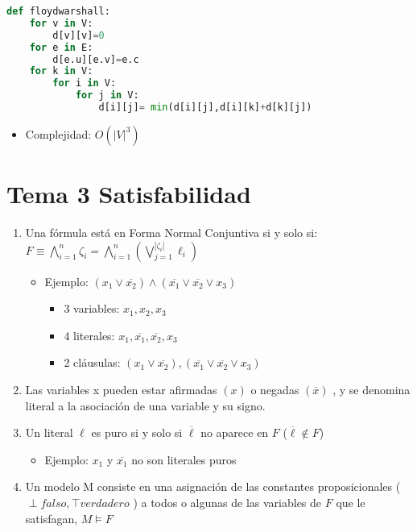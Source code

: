 \documentclass[12pt, twoside, openright]{report} %
\begin{document}
\begin{lstlisting}[language=Python]
def floydwarshall:
	for v in V:
		d[v][v]=0
	for e in E:
		d[e.u][e.v]=e.c
	for k in V:
		for i in V: 
			for j in V:
				d[i][j]= min(d[i][j],d[i][k]+d[k][j])
\end{lstlisting}

\begin{itemize}
	\item Complejidad: \(O(|V|^3)\)
\end{itemize}


\chapter{Tema 3 Satisfabilidad}

\begin{enumerate}
	\item Una fórmula está en Forma Normal Conjuntiva si y solo si:
	      \(F \equiv \bigwedge_{i=1}^{n} \zeta_i= \bigwedge_{i=1}^{n} (\bigvee_{j=1}^{\left | \zeta_i \right |} \ell_i)\)
	      \vspace{-0.5cm}
	      \begin{itemize}
		      \item Ejemplo:
		            \((x_1 \vee \overline{x_2})\wedge (\overline{x_1} \vee \overline{x_2} \vee x_3)\)

		            \begin{itemize}
			            \item 3 variables: \(x_1, x_2, x_3\)
			            \item 4 literales: \(x_1,\overline{x_1}, \overline{x_2}, x_3\)
			            \item 2 cláusulas:
			                  \((x_1 \vee \overline{x_2}),(\overline{x_1} \vee \overline{x_2} \vee x_3)\)
		            \end{itemize}
	      \end{itemize}
	\item Las variables x pueden estar afirmadas \((x)\) o negadas
	      \((\overline{x})\) , y se denomina literal a la asociación de una
	      variable y su signo.
	\item Un literal \(\ell\) es puro si y solo si \(\overline{\ell}\) no
	      aparece en \(F\) (\(\overline{\ell} \notin F\))

	      \begin{itemize}
		      \item Ejemplo: \(x_1\) y \(\overline{x_1}\) no son literales puros
	      \end{itemize}
	\item Un modelo M consiste en una asignación de las constantes
	      proposicionales (\(\perp falso,\top verdadero\) ) a todos o algunas
	      de las variables de \(F\) que le satisfagan, \(M \models F\)
\end{enumerate}
\end{document}
